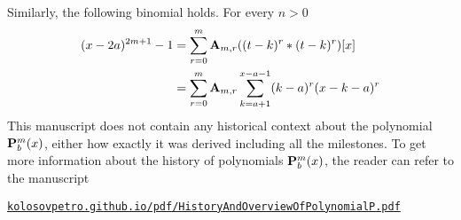 Similarly, the following binomial holds.
For every $n > 0$
\begin{equation*}
    \begin{split}
    (x-2a)
        ^{2m+1} - 1 &= \sum_{r=0}^{m} {\mathbf{A}} \sb{m,r} ((t-k)^r \ast (t-k)^r)[x] \\
                    &= \sum_{r=0}^{m} {\mathbf{A}} \sb{m,r} \sum_{k=a+1}^{x-a-1} (k-a)^r (x-k-a)^r
    \end{split}
\end{equation*}
This manuscript does not contain any historical context about the polynomial ${\mathbf{P}}\sp{m} \sb{b}(x)$,
either how exactly it was derived including all the milestones.
To get more information about the history of polynomials ${\mathbf{P}}\sp{m} \sb{b}(x)$, the reader can refer
to the manuscript
\begin{center}
    \href{https://kolosovpetro.github.io/pdf/HistoryAndOverviewOfPolynomialP.pdf}
    {\texttt{kolosovpetro.github.io/pdf/HistoryAndOverviewOfPolynomialP.pdf}}
\end{center}
